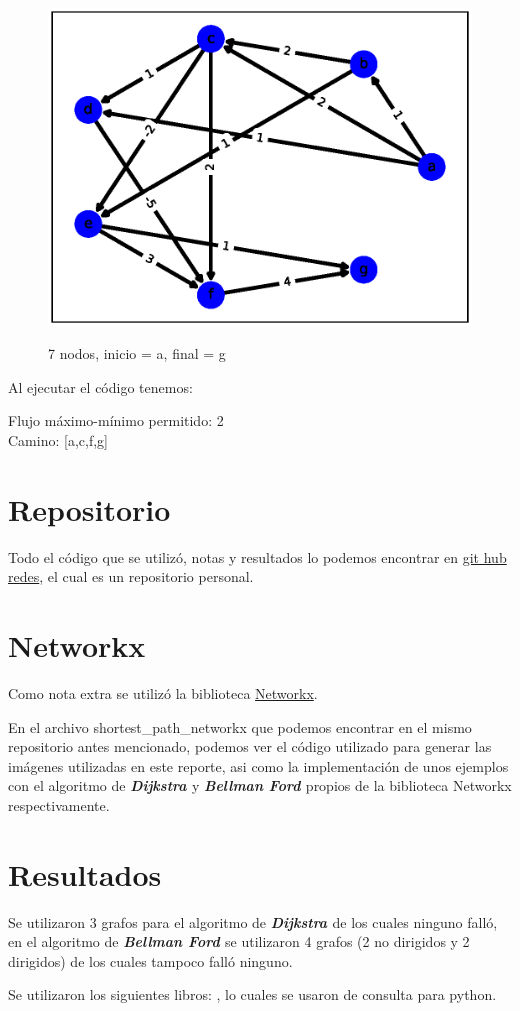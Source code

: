 \documentclass{report}
\newcommand{\dij}{{\bfseries {\textit{Dijkstra }}}}
\newcommand{\bell}{{\bfseries {\textit{Bellman Ford }}}}
\begin{document}
\begin{figure}[h!t]
    \centering
    \includegraphics[scale = 0.5]{ejemplo7.eps}
    \label{figura7}
    \caption{7 nodos, inicio = a, final = g}
\end{figure}

Al ejecutar el código tenemos:
\begin{center}
    Flujo máximo-mínimo permitido: 2 \\
    Camino: [a,c,f,g]
\end{center}

\section{Repositorio}
Todo el código que se utilizó, notas y resultados lo podemos encontrar en \href{https://github.com/arnoldae9/redes.git}{git hub redes}, el cual es un repositorio personal.

\section{Networkx}
Como nota extra se utilizó la biblioteca \href{https://networkx.org/}{Networkx}.

En el archivo shortest\_path\_networkx que podemos encontrar en el mismo repositorio antes mencionado, podemos ver el código utilizado para generar las imágenes utilizadas en este reporte, asi como la implementación de unos ejemplos con el algoritmo de \dij y \bell propios de la biblioteca Networkx respectivamente.
\section{Resultados}
Se utilizaron 3 grafos para el algoritmo de \dij de los cuales ninguno falló, en el algoritmo de \bell se utilizaron 4 grafos (2 no dirigidos y 2 dirigidos) de los cuales tampoco falló ninguno.

Se utilizaron los siguientes libros:
\cite{chun2001core}
\cite{van1991guia}
\cite{van2017tutorial}, lo cuales se usaron de consulta para python.


\end{document}
